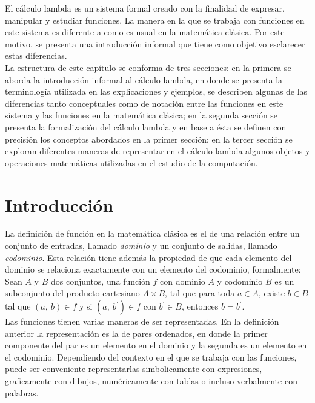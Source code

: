 El cálculo lambda es un sistema formal creado con la finalidad de expresar,
manipular y estudiar funciones. La manera en la que se trabaja con funciones en
este sistema es diferente a como es usual en la matemática clásica. Por este
motivo, se presenta una introducción informal que tiene como objetivo esclarecer
estas diferencias.\\

La estructura de este capítulo se conforma de tres secciones: en la primera se
aborda la introducción informal al cálculo lambda, en donde se presenta la
terminología utilizada en las explicaciones y ejemplos, se describen algunas de
las diferencias tanto conceptuales como de notación entre las funciones en este
sistema y las funciones en la matemática clásica; en la segunda sección
se presenta la formalización del cálculo lambda y en base a ésta se definen con
precisión los conceptos abordados en la primer sección; en la tercer sección se
exploran diferentes maneras de representar en el cálculo lambda algunos objetos
y operaciones matemáticas utilizadas en el estudio de la computación.\\

\section{Introducción} \label{sec:1.1}

La definición de función en la matemática clásica es el de una relación entre un
conjunto de entradas, llamado \emph{dominio} y un conjunto de salidas, llamado
\emph{codominio}. Esta relación tiene además la propiedad de que cada elemento
del dominio se relaciona exactamente con un elemento del codominio, formalmente:\\

Sean \(A\) y \(B\) dos conjuntos, una función \(f\) con dominio \(A\) y
codominio \(B\) es un subconjunto del producto cartesiano \(A\times B\), tal que
para toda \(a\in A\), existe \(b\in B\) tal que \((a,\ b)\in f\) y si \((a,\
b^\prime)\in f\) con \(b^\prime \in B\), entonces \(b=b^\prime\).\\

Las funciones tienen varias maneras de ser representadas. En la definición
anterior la representación es la de pares ordenados, en donde la primer componente
del par es un elemento en el dominio y la segunda es un elemento en el codominio.
Dependiendo del contexto en el que se trabaja con las funciones, puede ser
conveniente representarlas simbolicamente con expresiones, graficamente con
dibujos, numéricamente con tablas o incluso verbalmente con palabras.\\

